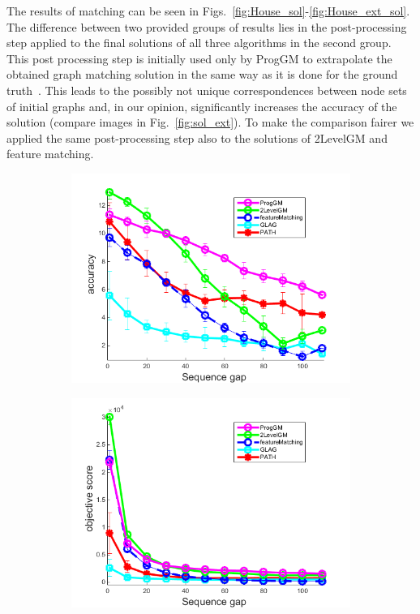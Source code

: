 The results of matching can be seen in Figs.~\ref{fig:House_sol}-\ref{fig:House_ext_sol}. The difference between two provided groups of results lies in the post-processing step applied to the final solutions of all three algorithms in the second group. This post processing step is initially used only by ProgGM to extrapolate the obtained graph matching solution in the same way as it is done for the ground truth~\cite{Cho2012_ProgressiveGM}. This leads to the possibly not unique correspondences between node sets of initial graphs and, in our opinion, significantly increases the accuracy of the solution (compare images in Fig.~\ref{fig:sol_ext}). To make the comparison fairer we applied the same post-processing step also to the solutions of 2LevelGM and feature matching.

\begin{figure}[h] \centering
		\begin{subfigure}[b]{0.33\textwidth}
			\centering
			\includegraphics[scale=0.25]{"chapter3/fig/HouseSeq2/anchor_descr/using_cpd_afftrafo/solution2/performance/accuracy"} 
		\end{subfigure} 
		\begin{subfigure}[b]{0.33\textwidth}
			\centering
			\includegraphics[scale=0.25]{"chapter3/fig/HouseSeq2/anchor_descr/using_cpd_afftrafo/solution2/performance/score"} 

\end{subfigure}
\end{figure}

